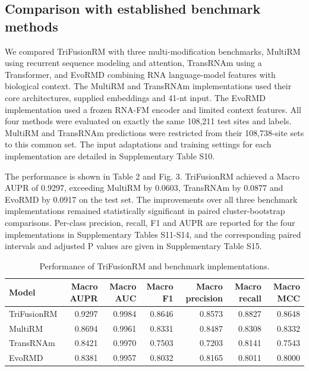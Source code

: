 \documentclass[unnumsec,webpdf,contemporary,large]{oup-authoring-template}
\begin{document}
\subsection{Comparison with established benchmark methods}

We compared TriFusionRM with three multi-modification benchmarks, MultiRM \citep{ref16} using recurrent sequence modeling and attention, TransRNAm \citep{ref17} using a Transformer, and EvoRMD \citep{ref19} combining RNA language-model features with biological context. The MultiRM and TransRNAm implementations used their core architectures, supplied embeddings and 41-nt input. The EvoRMD implementation used a frozen RNA-FM encoder and limited context features. All four methods were evaluated on exactly the same 108,211 test sites and labels. MultiRM and TransRNAm predictions were restricted from their 108,738-site sets to this common set. The input adaptations and training settings for each implementation are detailed in Supplementary Table S10. 

The performance is shown in Table 2 and Fig. 3. TriFusionRM achieved a Macro AUPR of 0.9297, exceeding MultiRM by 0.0603, TransRNAm by 0.0877 and EvoRMD by 0.0917 on the test set. The improvements over all three benchmark implementations remained statistically significant in paired cluster-bootstrap comparisons. Per-class precision, recall, F1 and AUPR are reported for the four implementations in Supplementary Tables S11-S14, and the corresponding paired intervals and adjusted P values are given in Supplementary Table S15.

\begin{table}[!ht]
\caption{Performance of TriFusionRM and benchmark implementations.}\centering
\fontsize{7.5}{9}\selectfont
\setlength{\tabcolsep}{3pt}
\setlength{\arrayrulewidth}{0.5pt}
\renewcommand{\arraystretch}{1.18}
\begin{tabular}{lrrrrrr}
\hline
Model & Macro AUPR & Macro AUC & Macro F1 & Macro precision & Macro recall & Macro MCC \\
\hline
TriFusionRM & 0.9297 & 0.9984 & 0.8646 & 0.8573 & 0.8827 & 0.8648 \\
MultiRM & 0.8694 & 0.9961 & 0.8331 & 0.8487 & 0.8308 & 0.8332 \\
TransRNAm & 0.8421 & 0.9970 & 0.7503 & 0.7203 & 0.8141 & 0.7543 \\
EvoRMD & 0.8381 & 0.9957 & 0.8032 & 0.8165 & 0.8011 & 0.8000 \\
\hline
\end{tabular}
\end{table}
\end{document}
